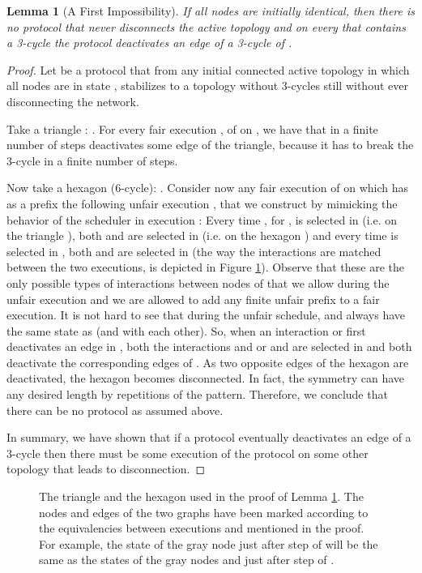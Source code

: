 \documentclass[preprint]{elsarticle}
\newtheorem{lemma}{Lemma}
\begin{document}
\begin{lemma} [A First Impossibility] \label{lem:first-impossibility}
If all nodes are initially identical, then there is no protocol that never disconnects the active topology and on every  that contains a 3-cycle the protocol deactivates an edge of a 3-cycle of .
\end{lemma}
\begin{proof}
Let  be a protocol that from any initial connected active topology in which all nodes are in state , stabilizes to
a topology without 3-cycles still without ever disconnecting the network.

Take a triangle : . For every fair execution , of  on , we have that in a finite number of steps  deactivates some
edge of the triangle, because it has to break the 3-cycle in a finite number of steps. 

Now take a hexagon  (6-cycle): . Consider now any fair execution  of  on  which has as a prefix the following unfair execution , that we construct by mimicking the behavior of the scheduler in execution : Every time , for , is selected in  (i.e. on the triangle ), both  and  are selected in  (i.e. on the hexagon ) and every time  is selected in , both  and  are selected in  (the way the interactions are matched between the two executions, is depicted in Figure \ref{fig:3-cycle}). Observe that these are the only possible types of interactions between nodes of  that we allow during the unfair execution  and we are allowed to add any finite unfair prefix to a fair execution. It is not hard to see that during the unfair schedule,  and  always have the same state as  (and with each other). So, when an interaction  or  first deactivates an edge in , both the interactions  and  or  and  are selected in  and both deactivate the corresponding edges of . As two opposite edges of the hexagon are deactivated, the hexagon becomes disconnected. In fact, the symmetry can have any desired length by  repetitions of the pattern. Therefore, we conclude that there can be no protocol  as assumed above.

In summary, we have shown that if a protocol eventually deactivates an edge of a 3-cycle then there must be some execution of the protocol on some other topology that leads to disconnection.
\end{proof}

\begin{figure}[!hbtp]
\caption{The triangle  and the hexagon  used in the proof of Lemma \ref{lem:first-impossibility}. The nodes and edges of the two graphs have been marked according to the equivalencies between executions  and  mentioned in the proof. For example, the state of the gray node  just after step  of  will be the same as the states of the gray nodes  and  just after step  of .} \label{fig:3-cycle}
\end{figure}
\end{document}
